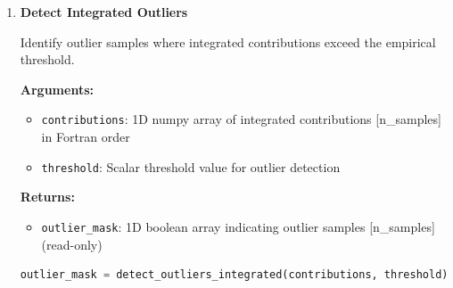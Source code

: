 \begin{enumerate}
\begin{enumerate}
                  \textbf{Arguments:}
                  \begin{itemize}
                    \item \texttt{contributions}: 1D numpy array of integrated contributions
                          [n\_samples] in Fortran order
                          
                    \item \texttt{percentile\_val}: Percentile value for threshold (0.0--100.0)
                  \end{itemize}
                  \textbf{Returns:}
                  \begin{itemize}
                    \item \texttt{threshold}: Scalar threshold value
                  \end{itemize}
                  \begin{lstlisting}[language=Python, caption={Integrated Threshold Calculation}]
threshold = calc_integrated_threshold(contributions, percentile_val)
                  \end{lstlisting}
                  
            \item \textbf{Detect Integrated Outliers}
                  
                  Identify outlier samples where integrated contributions exceed the empirical
                  threshold.
                  
                  \textbf{Arguments:}
                  \begin{itemize}
                    \item \texttt{contributions}: 1D numpy array of integrated contributions
                          [n\_samples] in Fortran order
                          
                    \item \texttt{threshold}: Scalar threshold value for outlier detection
                  \end{itemize}
                  \textbf{Returns:}
                  \begin{itemize}
                    \item \texttt{outlier\_mask}: 1D boolean array indicating outlier samples
                          [n\_samples] (read-only)
                  \end{itemize}
                  \begin{lstlisting}[language=Python, caption={Integrated Outlier Detection}]
outlier_mask = detect_outliers_integrated(contributions, threshold)
                  \end{lstlisting}
                  

\end{enumerate}
\end{enumerate}

